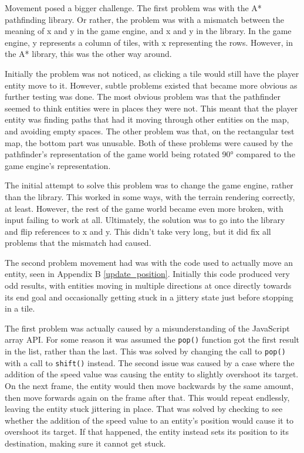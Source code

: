 Movement posed a bigger challenge. The first problem was with the A* pathfinding library. Or rather, the problem was with a mismatch between the meaning of x and y in the game engine, and x and y in the library. In the game engine, y represents a column of tiles, with x representing the rows. However, in the A* library, this was the other way around.

Initially the problem was not noticed, as clicking a tile would still have the player entity move to it. However, subtle problems existed that became more obvious as further testing was done. The most obvious problem was that the pathfinder seemed to think entities were in places they were not. This meant that the player entity was finding paths that had it moving through other entities on the map, and avoiding empty spaces. The other problem was that, on the rectangular test map, the bottom part was unusable. Both of these problems were caused by the pathfinder's representation of the game world being rotated 90° compared to the game engine's representation.

The initial attempt to solve this problem was to change the game engine, rather than the library. This worked in some ways, with the terrain rendering correctly, at least. However, the rest of the game world became even more broken, with input failing to work at all. Ultimately, the solution was to go into the library and flip references to x and y. This didn't take very long, but it did fix all problems that the mismatch had caused.

The second problem movement had was with the code used to actually move an entity, seen in Appendix B \ref{update_position}. Initially this code produced very odd results, with entities moving in multiple directions at once directly towards its end goal and occasionally getting stuck in a jittery state just before stopping in a tile.

The first problem was actually caused by a misunderstanding of the JavaScript array API. For some reason it was assumed the \texttt{pop()} function got the first result in the list, rather than the last. This was solved by changing the call to \texttt{pop()} with a call to \texttt{shift()} instead. The second issue was caused by a case where the addition of the speed value was causing the entity to slightly overshoot its target. On the next frame, the entity would then move backwards by the same amount, then move forwards again on the frame after that. This would repeat endlessly, leaving the entity stuck jittering in place. That was solved by checking to see whether the addition of the speed value to an entity's position would cause it to overshoot its target. If that happened, the entity instead sets its position to its destination, making sure it cannot get stuck.

